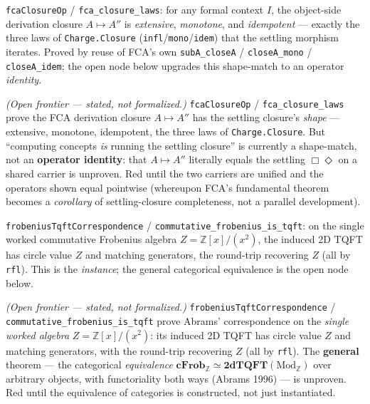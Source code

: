 \begin{theorem}\label{thm:fca-closure-laws}\leanok{}
\texttt{fcaClosureOp} / \texttt{fca\_closure\_laws}: for any formal context $I$, the object-side derivation closure $A\mapsto A''$ is \emph{extensive}, \emph{monotone}, and \emph{idempotent} --- exactly the three laws of \texttt{Charge.Closure} (\texttt{infl}/\texttt{mono}/\texttt{idem}) that the settling morphism iterates. Proved by reuse of FCA's own \texttt{subA\_closeA} / \texttt{closeA\_mono} / \texttt{closeA\_idem}; the open node below upgrades this shape-match to an operator \emph{identity}.
\end{theorem}
\begin{theorem}\label{thm:fca-closure-eq-settling}\notready{}
\emph{(Open frontier --- stated, not formalized.)} \texttt{fcaClosureOp} / \texttt{fca\_closure\_laws} prove the FCA derivation closure $A \mapsto A''$ has the settling closure's \emph{shape} --- extensive, monotone, idempotent, the three laws of \texttt{Charge.Closure}. But ``computing concepts \emph{is} running the settling closure'' is currently a shape-match, not an \textbf{operator identity}: that $A \mapsto A''$ literally equals the settling $\Box\Diamond$ on a shared carrier is unproven. Red until the two carriers are unified and the operators shown equal pointwise (whereupon FCA's fundamental theorem becomes a \emph{corollary} of settling-closure completeness, not a parallel development).
\end{theorem}
\begin{theorem}\label{thm:frobenius-tqft-instance}\leanok{}
\texttt{frobeniusTqftCorrespondence} / \texttt{commutative\_frobenius\_is\_tqft}: on the single worked commutative Frobenius algebra $Z=\mathbb{Z}[x]/(x^2)$, the induced 2D TQFT has circle value $Z$ and matching generators, the round-trip recovering $Z$ (all by \texttt{rfl}). This is the \emph{instance}; the general categorical equivalence is the open node below.
\end{theorem}
\begin{theorem}\label{thm:abrams-equivalence-general}\notready{}
\emph{(Open frontier --- stated, not formalized.)} \texttt{frobeniusTqftCorrespondence} / \texttt{commutative\_frobenius\_is\_tqft} prove Abrams' correspondence on the \emph{single worked algebra} $Z = \mathbb{Z}[x]/(x^2)$: its induced 2D TQFT has circle value $Z$ and matching generators, with the round-trip recovering $Z$ (all by \texttt{rfl}). The \textbf{general} theorem --- the categorical \emph{equivalence} $\mathbf{cFrob}_\mathbb{Z} \simeq \mathbf{2dTQFT}(\mathrm{Mod}_\mathbb{Z})$ over arbitrary objects, with functoriality both ways (Abrams 1996) --- is unproven. Red until the equivalence of categories is constructed, not just instantiated.
\end{theorem}
